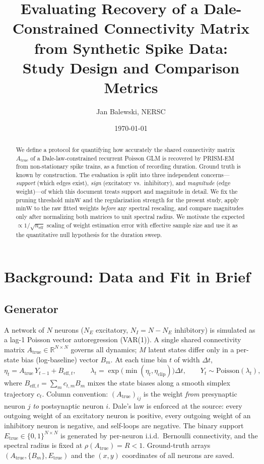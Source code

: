 \documentclass[11pt]{article}
\title{Evaluating Recovery of a Dale-Constrained Connectivity Matrix\\
from Synthetic Spike Data:\\
Study Design and Comparison Metrics}
\author{Jan Balewski, NERSC}
\date{\today}
\newcommand{\Atrue}{A_{\mathrm{true}}}
\newcommand{\Etrue}{E_{\mathrm{true}}}
\newcommand{\minW}{\mathrm{minW}}
\newcommand{\neff}{n_{\mathrm{eff}}}
\begin{document}
\maketitle

\begin{abstract}
We define a protocol for quantifying how accurately the shared connectivity
matrix $\Atrue$ of a Dale-law-constrained recurrent Poisson GLM is recovered
by PRISM-EM from non-stationary spike trains, as a function of recording
duration. Ground truth is known by construction. The evaluation is split into
three independent concerns---\emph{support} (which edges exist), \emph{sign}
(excitatory vs.\ inhibitory), and \emph{magnitude} (edge weight)---of which
this document treats support and magnitude in detail. We fix the pruning
threshold $\minW$ and the regularization strength for the present study, apply
$\minW$ to the raw fitted weights \emph{before} any spectral rescaling, and
compare magnitudes only after normalizing both matrices to unit spectral
radius. We motivate the expected $\propto 1/\sqrt{\neff}$ scaling of weight
estimation error with effective sample size and use it as the quantitative
null hypothesis for the duration sweep.
\end{abstract}


\section{Background: Data and Fit in Brief}
\label{sec:background}

\subsection{Generator}
A network of $N$ neurons ($N_E$ excitatory, $N_I = N - N_E$ inhibitory) is
simulated as a lag-1 Poisson vector autoregression (VAR(1)). A single shared
connectivity matrix $\Atrue \in \mathbb{R}^{N\times N}$ governs all dynamics;
$M$ latent states differ only in a per-state bias (log-baseline) vector $B_m$.
At each time bin $t$ of width $\Delta t$,
\begin{equation}
  \eta_t = \Atrue\, Y_{t-1} + B_{\mathrm{eff},t},\qquad
  \lambda_t = \exp\!\bigl(\min(\eta_t,\eta_{\mathrm{clip}})\bigr)\Delta t,\qquad
  Y_t \sim \mathrm{Poisson}(\lambda_t),
\end{equation}
where $B_{\mathrm{eff},t}=\sum_m c_{t,m}B_m$ mixes the state biases along a
smooth simplex trajectory $c_t$. Column convention: $(\Atrue)_{ij}$ is the
weight \emph{from} presynaptic neuron $j$ \emph{to} postsynaptic neuron $i$.
Dale's law is enforced at the source: every outgoing weight of an excitatory
neuron is positive, every outgoing weight of an inhibitory neuron is negative,
and self-loops are negative. The binary support $\Etrue\in\{0,1\}^{N\times N}$
is generated by per-neuron i.i.d.\ Bernoulli connectivity, and the spectral
radius is fixed at $\rho(\Atrue)=R<1$. Ground-truth arrays
$(\Atrue, \{B_m\}, \Etrue)$ and the $(x,y)$ coordinates of all neurons are
saved.
\end{document}
